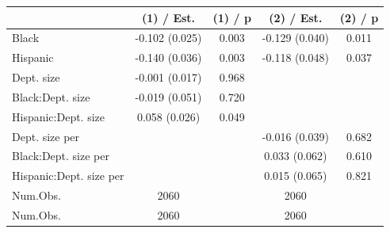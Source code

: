 
\begin{tabular}[t]{lcccc}
\toprule
  & (1) / Est. & (1) / p & (2) / Est. & (2) / p\\
\midrule
Black & -0.102 
(0.025) & 0.003 & -0.129 
(0.040) & 0.011\\
Hispanic & -0.140 
(0.036) & 0.003 & -0.118 
(0.048) & 0.037\\
Dept. size & -0.001 
(0.017) & 0.968 &  & \\
Black:Dept. size & -0.019 
(0.051) & 0.720 &  & \\
Hispanic:Dept. size & 0.058 
(0.026) & 0.049 &  & \\
Dept. size per &  &  & -0.016 
(0.039) & 0.682\\
Black:Dept. size per &  &  & 0.033 
(0.062) & 0.610\\
Hispanic:Dept. size per &  &  & 0.015 
(0.065) & 0.821\\
\midrule
Num.Obs. & 2060 &  & 2060 \vphantom{1} & \\
Num.Obs. & 2060 &  & 2060 & \\
\bottomrule
\end{tabular}
